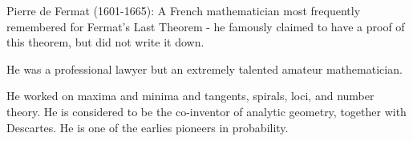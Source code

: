 Pierre de Fermat (1601-1665): A French mathematician most frequently remembered
for Fermat's Last Theorem - he famously claimed to have a proof of this theorem,
but did not write it down.
\par
He was a professional lawyer but an extremely talented amateur mathematician.
\par
He worked on maxima and minima and tangents, spirals, loci, and number theory. He is considered to be the co-inventor of analytic geometry, together with Descartes. He is one of the earlies pioneers in probability.